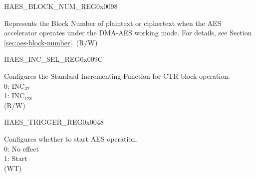 \begin{register}{H}{AES\_BLOCK\_NUM\_REG}{0x0098}\label{regdesc:AESBLOCKNUMREG}
%
\regnewline%
\begin{regdesc}\begin{reglist}
\item [AES\_BLOCK\_NUM] Represents the Block Number of plaintext or ciphertext when the AES accelerator operates under the DMA-AES working mode. For details, see Section \ref{sec:aes-block-number}. (R/W)
\end{reglist}\end{regdesc}
\end{register}


\begin{register}{H}{AES\_INC\_SEL\_REG}{0x009C}\label{regdesc:AESINCSELREG}
%
%
\regnewline%
\begin{regdesc}\begin{reglist}
\item [AES\_INC\_SEL] Configures the Standard Incrementing Function for CTR block operation. \\
0: INC$_{32}$\\
1: INC$_{128}$\\
(R/W)
\end{reglist}\end{regdesc}
\end{register}


\begin{register}{H}{AES\_TRIGGER\_REG}{0x0048}\label{regdesc:AESTRIGGERREG}
%
%
\regnewline%
\begin{regdesc}\begin{reglist}
\item [AES\_TRIGGER] Configures whether to start AES operation. \\
0: No effect\\
1: Start\\
(WT)
\end{reglist}\end{regdesc}
\end{register}


